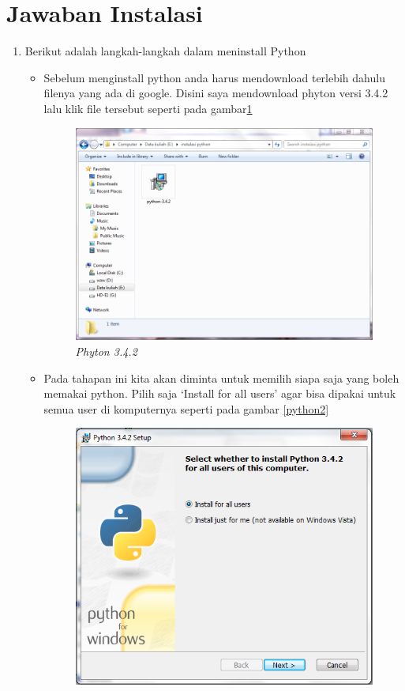 \section{Jawaban Instalasi}
\begin{enumerate}
    \item Berikut adalah langkah-langkah dalam meninstall Python
    \par
    \begin{itemize}
    \item Sebelum menginstall python anda harus mendownload terlebih dahulu filenya yang ada di google. Disini saya mendownload phyton versi 3.4.2 lalu klik file tersebut seperti pada gambar\ref{python1}
    \begin{figure}[!htbp]
    \centering 
    \includegraphics[scale=0.4]{figures/python1.PNG} 
    \caption{\textit{Phyton 3.4.2}}
    \label{python1}
\end{figure}
    \item Pada tahapan ini kita akan diminta untuk memilih siapa saja yang boleh memakai python. Pilih saja ‘Install for all users’ agar bisa dipakai untuk semua user di komputernya seperti pada gambar \ref{python2}
    \begin{figure}[!htbp]
    \centering 
    \includegraphics[scale=0.5]{figures/python2.PNG} 

\end{figure}
\end{itemize}
\end{enumerate}
